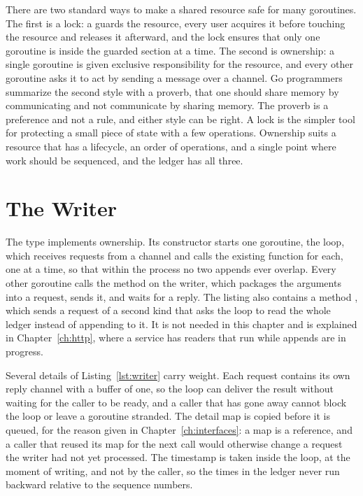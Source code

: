 There are two standard ways to make a shared resource safe for many goroutines. The first is a lock: a  guards the resource, every user acquires it before touching the resource and releases it afterward, and the lock ensures that only one goroutine is inside the guarded section at a time. The second is ownership: a single goroutine is given exclusive responsibility for the resource, and every other goroutine asks it to act by sending a message over a channel. Go programmers summarize the second style with a proverb, that one should share memory by communicating and not communicate by sharing memory. The proverb is a preference and not a rule, and either style can be right. A lock is the simpler tool for protecting a small piece of state with a few operations. Ownership suits a resource that has a lifecycle, an order of operations, and a single point where work should be sequenced, and the ledger has all three.

\section{The Writer}

The type  implements ownership. Its constructor starts one goroutine, the loop, which receives requests from a channel and calls the existing  function for each, one at a time, so that within the process no two appends ever overlap. Every other goroutine calls the method  on the writer, which packages the arguments into a request, sends it, and waits for a reply. The listing also contains a method , which sends a request of a second kind that asks the loop to read the whole ledger instead of appending to it. It is not needed in this chapter and is explained in Chapter~\ref{ch:http}, where a service has readers that run while appends are in progress.


Several details of Listing~\ref{lst:writer} carry weight. Each request contains its own reply channel with a buffer of one, so the loop can deliver the result without waiting for the caller to be ready, and a caller that has gone away cannot block the loop or leave a goroutine stranded. The detail map is copied before it is queued, for the reason given in Chapter~\ref{ch:interfaces}: a map is a reference, and a caller that reused its map for the next call would otherwise change a request the writer had not yet processed. The timestamp is taken inside the loop, at the moment of writing, and not by the caller, so the times in the ledger never run backward relative to the sequence numbers.

